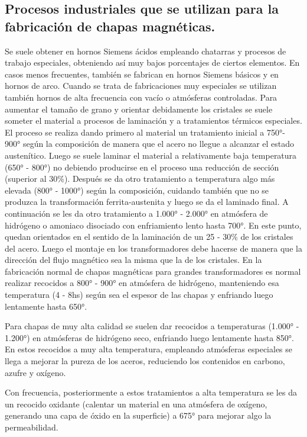 \documentclass[12pt,a4paper]{article}
\begin{document}
\subsection{Procesos industriales que se utilizan para la fabricación de chapas magnéticas.}

Se suele obtener en hornos Siemens ácidos empleando chatarras y procesos de trabajo especiales, obteniendo así muy bajos porcentajes de ciertos elementos. En casos menos frecuentes, también se fabrican en hornos Siemens básicos y en hornos de arco. Cuando se trata de fabricaciones muy especiales se utilizan también hornos de alta frecuencia con vacío o atmósferas controladas.
Para aumentar el tamaño de grano y orientar debidamente los cristales se suele someter el material a procesos de laminación y a tratamientos térmicos especiales. El proceso se realiza dando primero al material un tratamiento inicial a 750°- 900° según la composición de manera que el acero no llegue a alcanzar el estado austenítico. Luego se suele laminar el material a relativamente baja temperatura (650° - 800°) no debiendo producirse en el proceso una reducción de sección (superior al 30\%). Después se da otro tratamiento a temperatura algo más elevada (800° - 1000°) según la composición, cuidando también que no se produzca la transformación ferrita-austenita y luego se da el laminado final. A continuación se les da otro tratamiento a 1.000° - 2.000° en atmósfera de hidrógeno o amoniaco disociado con enfriamiento lento hasta 700°. En este punto, quedan orientados en el sentido de la laminación de un 25 - 30\% de los cristales del acero. Luego el montaje en los transformadores debe hacerse de manera que la dirección del flujo magnético sea la misma que la de los cristales. 
En la fabricación normal de chapas magnéticas para grandes transformadores es normal realizar recocidos a 800° - 900° en atmósfera de hidrógeno, manteniendo esa temperatura (4 - 8hs) según sea el espesor de las chapas y enfriando luego lentamente hasta 650°.

Para chapas de muy alta calidad se suelen dar recocidos a temperaturas (1.000° - 1.200°) en atmósferas de hidrógeno seco, enfriando luego lentamente hasta 850°. En estos recocidos a muy alta temperatura, empleando atmósferas especiales se llega a mejorar la pureza de los aceros, reduciendo los contenidos en carbono, azufre y oxígeno. 

Con frecuencia, posteriormente a estos tratamientos a alta temperatura se les da un recocido oxidante (calentar un material en una atmósfera de oxígeno, generando una capa de óxido en la superficie) a 675° para mejorar algo la permeabilidad.
\end{document}
